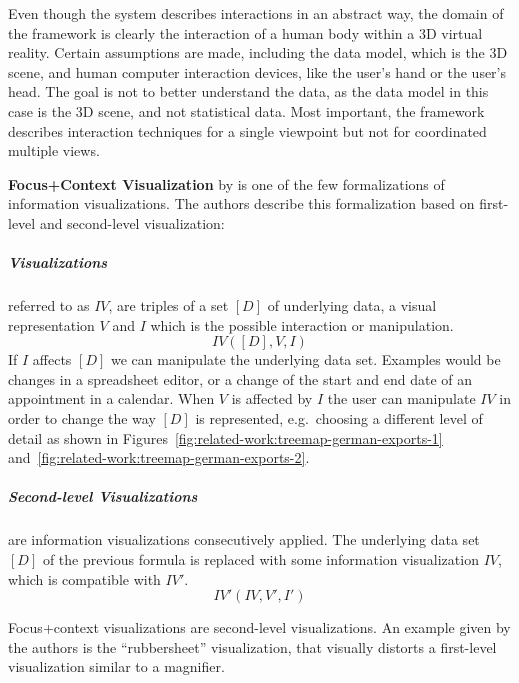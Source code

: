 Even though the system describes interactions in an abstract way, the domain of the framework is clearly the interaction of a human body within a 3D virtual reality.
Certain assumptions are made, including the data model, which is the 3D scene, and human computer interaction devices, like the user's hand or the user's head.
The goal is not to better understand the data, as the data model in this case is the 3D scene, and not statistical data.
Most important, the framework describes interaction techniques for a single viewpoint but not for coordinated multiple views.

\textbf{Focus+Context Visualization} by \textcite{Bjork1999} is one of the few formalizations of information visualizations.
The authors describe this formalization based on first-level and second-level visualization:
\subparagraph{Visualizations} referred to as $IV$, are triples of a set $[D]$ of underlying data, a visual representation $V$ and $I$ which is the possible interaction or manipulation.
\begin{equation}
  IV([D], V, I)
\end{equation}
If $I$ affects $[D]$ we can manipulate the underlying data set.
Examples would be changes in a spreadsheet editor, or a change of the start and end date of an appointment in a calendar.
When $V$ is affected by $I$ the user can manipulate $IV$ in order to change the way $[D]$ is represented, e.g.\ choosing a different level of detail as shown in Figures~\ref{fig:related-work:treemap-german-exports-1} and~\ref{fig:related-work:treemap-german-exports-2}.

\subparagraph{Second-level Visualizations} are information visualizations consecutively applied.
The underlying data set $[D]$ of the previous formula is replaced with some information visualization $IV$, which is compatible with $IV'$.
\begin{equation}
  IV'(IV, V', I')
\end{equation}


Focus+context visualizations are second-level visualizations.
An example given by the authors is the  ``rubbersheet'' visualization, that visually distorts a first-level visualization similar to a magnifier.

